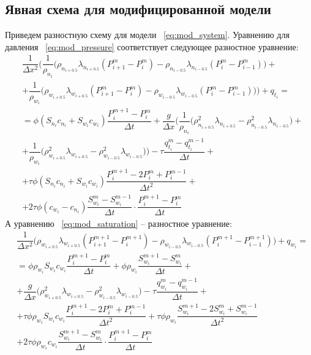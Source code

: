\subsection{Явная схема для модифицированной модели}
\label{mod_model_explicit}
Приведем разностную схему для модели ~\eqref{eq:mod_system}.
Уравнению для давления ~\eqref{eq:mod_pressure} соответствует следующее разностное уравнение:
\begin{equation} \label{eq:mod_scheme_p}
 \begin{aligned} 
  & \dfrac{1}{\Delta x^2} \bigg(\dfrac{1}{\rho_{n_i}} \big( \rho_{n_{i+0.5}} \lambda_{n_{i+0.5}} (P_{i+1}^m - P_i^m)
  - \rho_{n_{i-0.5}} \lambda_{n_{i-0.5}} (P_i^m - P_{i-1}^m)\big) + \\
  &+ \dfrac{1}{\rho_{w_i}} \big( \rho_{w_{i+0.5}} \lambda_{w_{i+0.5}} (P_{i+1}^m - P_i^m)
  - \rho_{w_{i-0.5}} \lambda_{w_{i-0.5}} (P_i^m - P_{i-1}^m)\big)\bigg) + q_{t_i} = \\
  &= \phi(S_{n_i}c_{n_i}+S_{w_i}c_{w_i}) \dfrac{P_i^{m+1} - P_i^m}{\Delta t}
  + \dfrac{g}{\Delta x} \bigg(\dfrac{1}{\rho_{n_i}} \big( \rho_{n_{i+0.5}}^2 \lambda_{n_{i+0.5}} 
  - \rho_{n_{i-0.5}}^2 \lambda_{n_{i-0.5}} \big) + \\
  &+ \dfrac{1}{\rho_{w_i}} \big( \rho_{w_{i+0.5}}^2 \lambda_{w_{i+0.5}} 
  - \rho_{w_{i-0.5}}^2 \lambda_{w_{i-0.5}} \big)\bigg)
  - \tau \dfrac{q_{t_i}^m-q_{t_i}^{m-1}}{\Delta t} + \\
  &+ \tau \phi (S_{n_i}c_{n_i}+S_{w_i}c_{w_i}) \dfrac{P_i^{m+1}-2P_i^m+P_i^{m-1}}{\Delta t^2} +\\
  &+ 2 \tau \phi (c_{w_i}-c_{n_i}) \dfrac{S_{w_i}^m-S_{w_i}^{m-1}}{\Delta t} \cdot \dfrac{P_i^{m+1}-P_i^m}{\Delta t}
 \end{aligned}
\end{equation}
А уравнению ~\eqref{eq:mod_saturation} -- разностное уравнение:
\begin{equation} \label{eq:mod_scheme_s}
 \begin{aligned} 
  & \dfrac{1}{\Delta x^2} \bigg(\rho_{w_{i+0.5}} \lambda_{w_{i+0.5}} (P_{i+1}^{m+1} - P_i^{m+1})
  - \rho_{w_{i-0.5}} \lambda_{w_{i-0.5}} (P_i^{m+1} - P_{i-1}^{m+1}) \bigg) + q_{w_i} = \\
  &= \phi\rho_{w_i}S_{w_i}c_{w_i} \dfrac{P_i^{m+1} - P_i^m}{\Delta t} + \phi\rho_{w_i} \dfrac{S_{w_i}^{m+1} - S_{w_i}^m}{\Delta t} +\\ 
  &+ \dfrac{g}{\Delta x} \bigg(\rho_{w_{i+0.5}}^2 \lambda_{w_{i+0.5}} - \rho_{w_{i-0.5}}^2 \lambda_{w_{i-0.5}} \bigg)
  - \tau \dfrac{q_{w_i}^m-q_{w_i}^{m-1}}{\Delta t} + \\
  &+ \tau \phi \rho_{w_i}S_{w_i}c_{w_i} \dfrac{P_i^{m+1}-2P_i^m+P_i^{m-1}}{\Delta t^2}
  + \tau \phi \rho_{w_i} \dfrac{S_{w_i}^{m+1}-2S_{w_i}^m+S_{w_i}^{m-1}}{\Delta t^2} \\
  &+ 2 \tau \phi \rho_{w_i} c_{w_i} \dfrac{S_{w_i}^{m+1}-S_{w_i}^{m}}{\Delta t} \cdot \dfrac{P_i^{m+1}-P_i^m}{\Delta t}
 \end{aligned}
\end{equation}
